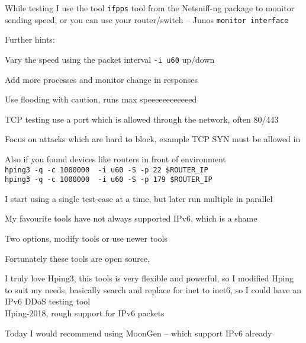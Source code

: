 \documentclass[Screen16to9,17pt]{foils}
\begin{document}
While testing I use the tool \verb+ifpps+ tool from the Netsniff-ng package  to monitor sending speed, or you can use your router/switch -- Junos \verb+monitor interface+



Further hints:
\begin{list2}
\item Vary the speed using the packet interval \verb+-i u60+ up/down
\item Add more processes and monitor change in responses
\item Use flooding with caution, runs max speeeeeeeeeeeed \smiley
\item TCP testing use a port which is allowed through the network, often 80/443
\item Focus on attacks which are hard to block, example TCP SYN must be allowed in
\item Also if you found devices like routers in front of environment\\
\verb+hping3 -q -c 1000000  -i u60 -S -p 22 $ROUTER_IP+\\
\verb+hping3 -q -c 1000000  -i u60 -S -p 179 $ROUTER_IP+
\end{list2}

I start using a single test-case at a time, but later run multiple in parallel


My favourite tools have not always supported IPv6, which is a shame

Two options, modify tools or use newer tools

\begin{list2}
\item Fortunately these tools are open source,

\item I truly love Hping3, this tools is very flexible and powerful, so I modified Hping to suit my needs, basically search and replace for inet to inet6, so I could have an IPv6 DDoS testing tool\\
 Hping-2018, rough support for IPv6 packets
\item Today I would recommend using MoonGen -- which support IPv6 already\\
\end{list2}


\end{document}
